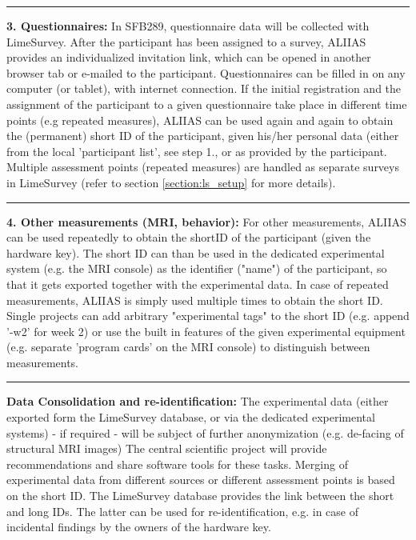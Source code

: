 \par\noindent\rule{\textwidth\color{pniblue}}{0.4pt}
\textbf{3. Questionnaires:}
 In SFB289, questionnaire data will be collected with LimeSurvey. After the participant has been assigned to a survey, ALIIAS provides an individualized invitation link, which can be opened in another browser tab or e-mailed to the participant. Questionnaires can be filled in on any computer (or tablet), with internet connection. 
 If the initial registration and the assignment of the participant to a given questionnaire take place in different time points (e.g repeated measures), ALIIAS can be used again and again to obtain the (permanent) short ID of the participant, given his/her personal data (either from the local 'participant list', see step 1., or as provided by the participant.
 Multiple assessment points (repeated measures) are handled as separate surveys in LimeSurvey (refer to section \ref{section:ls_setup} for more details).
 
 \par\noindent\rule{\textwidth\color{pniblue}}{0.4pt}
 \textbf{4. Other measurements (MRI, behavior):}
 For other measurements, ALIIAS can be used repeatedly to obtain the shortID of the participant (given the hardware key). The short ID can than be used in the dedicated experimental system (e.g. the MRI console) as the identifier ("name") of the participant, so that it gets exported together with the experimental data. In case of repeated measurements, ALIIAS is simply used multiple times to obtain the short ID. Single projects can add arbitrary "experimental tags" to the short ID (e.g. append '-w2' for week 2) or use the built in features of the given experimental equipment (e.g. separate 'program cards' on the MRI console) to distinguish between measurements.

\par\noindent\rule{\textwidth\color{pniblue}}{0.4pt}
\textbf{Data Consolidation and re-identification:} The experimental data (either exported form the LimeSurvey database, or via the dedicated experimental systems) - if required - will be subject of further anonymization (e.g. de-facing of structural MRI images) The central scientific project will provide recommendations and share software tools for these tasks. Merging of experimental data from different sources or different assessment points is based on the short ID. The LimeSurvey database provides the link between the short and long IDs. The latter can be used for re-identification, e.g. in case of incidental findings by the owners of the hardware key.